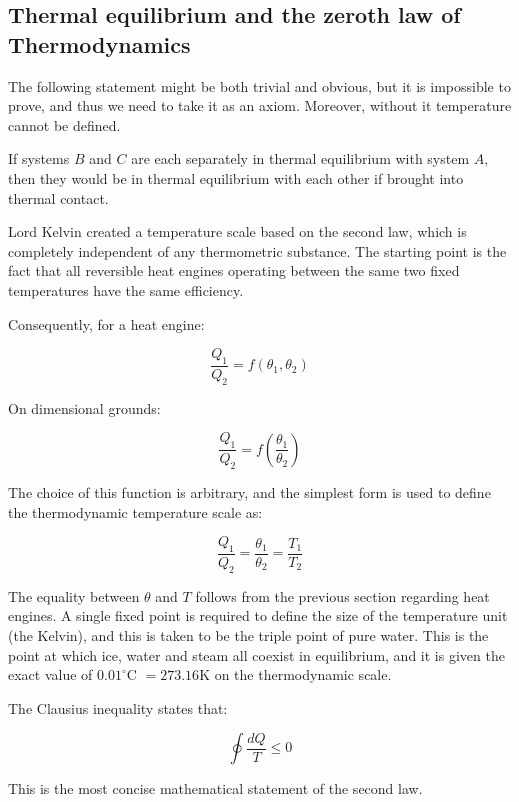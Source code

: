 \documentclass{article}
\begin{document}
\newpage

\subsection{Thermal equilibrium and the zeroth law of Thermodynamics}

The following statement might be both trivial and obvious, but it is impossible to prove, and thus we need to take it as an axiom. Moreover, without it temperature cannot be defined.

\begin{theorem}
    If systems $B$ and $C$ are each separately in thermal equilibrium with system $A$, then they would be in thermal equilibrium with each other if brought into thermal contact.
\end{theorem}

Lord Kelvin created a temperature scale based on the second law, which is completely independent of any thermometric substance. The starting point is the fact that all reversible heat engines operating between the same two fixed temperatures have the same efficiency.

Consequently, for a heat engine:

\[ \frac{Q_1}{Q_2} = f(\theta_1, \theta_2) \]

On dimensional grounds:

\[ \frac{Q_1}{Q_2} = f\left(\frac{\theta_1}{\theta_2}\right) \]

The choice of this function is arbitrary, and the simplest form is used to define the thermodynamic temperature scale as:

\[ \frac{Q_1}{Q_2} = \frac{\theta_1}{\theta_2} = \frac{T_1}{T_2} \]

The equality between $\theta$ and $T$ follows from the previous section regarding heat engines. A single fixed point is required to define the size of the temperature unit (the Kelvin), and this is taken to be the triple point of pure water. This is the point at which ice, water and steam all coexist in equilibrium, and it is given the exact value of $0.01^\circ$C $ = 273.16$K on the thermodynamic scale.

\begin{theorem}
    The Clausius inequality states that:

    \[ \oint \frac{dQ}{T} \leq 0 \]

    This is the most concise mathematical statement of the second law.
\end{theorem}
\end{document}
